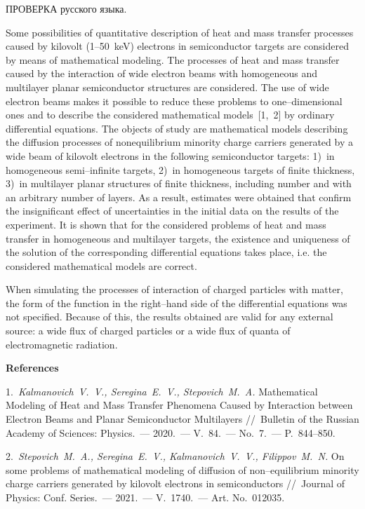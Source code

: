 
\vzmscaption

ПРОВЕРКА русского языка.

Some possibilities of quantitative description of heat and mass transfer processes caused by kilovolt (1--50~keV) electrons in semiconductor targets are considered by means of ma\-the\-ma\-ti\-cal modeling. The processes of heat and mass transfer cau\-sed by the interaction of wide electron beams with homogeneous and multilayer planar semiconductor structures are considered. The use of wide electron beams makes it possible to reduce these problems to one--dimensional ones and to describe the con\-si\-de\-red mathematical models~[1,~2] by ordinary differential equations. The objects of study are mathematical models des\-cri\-bing the diffusion processes of nonequilibrium minority cha\-rge carriers generated by a wide beam of kilovolt electrons in the following semiconductor targets: 1)~in homogeneous semi--in\-fi\-nite targets, 2)~in homogeneous targets of finite thickness, 3)~in multilayer planar structures of finite thickness, including number and with an arbitrary number of layers. As a result, estimates were ob\-tai\-ned that confirm the insignificant effect of un\-cer\-tain\-ties in the initial data on the results of the experiment. It is shown that for the considered problems of heat and mass transfer in homogeneous and multilayer targets, the existence and uni\-que\-ness of the solution of the corresponding differential equations takes place, i.e. the considered mathematical models are correct.

When simulating the processes of interaction of char\-ged particles with matter, the form of the function in the right--hand side of the differential equations was not specified. Because of this, the results obtained are valid for any external source: a wide flux of charged particles or a wide flux of quanta of electromagnetic radiation.

\bigskip
\centerline{\bf References}
\medskip

1.~{\it Kalmanovich~V.~V., Seregina~E.~V., Stepovich~M.~A.} Mathematical Modeling of Heat and Mass Transfer Phenomena Caused by Interaction between Electron Beams and Planar Semiconductor Multilayers //~Bulletin of the Russian Academy of Sciences: Physics.~--- 2020.~--- V.~84.~--- No.~7.~--- P.~844--850.

2.~{\it Stepovich~M.~A., Seregina~E.~V., Kalmanovich~V.~V., Filippov~M.~N.} On some problems of mathematical modeling of diffusion of non--equilibrium minority charge carriers generated by kilovolt electrons in semiconductors //~Journal of Physics: Conf. Series.~--- 2021.~--- V.~1740.~--- Art. No.~012035.
